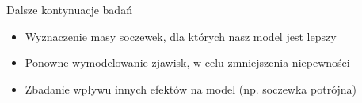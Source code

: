 \documentclass{beamer}
\begin{document}
\begin{frame}{Dalsze kontynuacje badań}
    \begin{itemize}
        \item Wyznaczenie masy soczewek, dla których nasz model jest lepszy
        \item Ponowne wymodelowanie zjawisk, w celu zmniejszenia niepewności
        \item Zbadanie wpływu innych efektów na model (np. soczewka potrójna)
    \end{itemize}
\end{frame}
\end{document}
